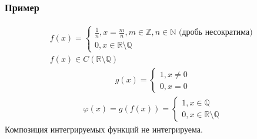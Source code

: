 \documentclass{article}
\begin{document}
\subsubsection{Пример}
\begin{gather*}
    f(x) = \begin{cases}
        \frac{1}{n}, x = \frac{m}{n}, m \in \mathbb{Z}, n \in \mathbb{N} \text{ (дробь несократима)} \\
        0, x \in \mathbb{R} \setminus \mathbb{Q}
    \end{cases} \\
    f(x) \in C(\mathbb{R} \setminus \mathbb{Q})
\end{gather*}
\begin{gather*}
    g(x) = \begin{cases}
        1, x \neq 0 \\
        0, x = 0
    \end{cases}
\end{gather*}
\begin{gather*}
    \varphi(x) = g(f(x)) = \begin{cases}
        1, x \in \mathbb{Q} \\
        0, x \in \mathbb{R} \setminus \mathbb{Q}
    \end{cases}
\end{gather*}
Композиция интегрируемых функций не интегрируема.
\end{document}
